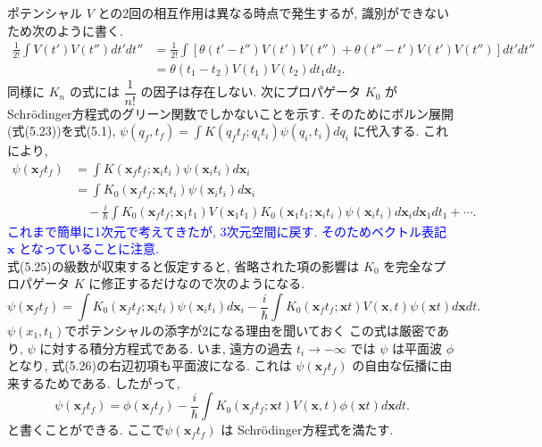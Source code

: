 \documentclass[a4paper,12pt]{article}
\begin{document}
ポテンシャル $V$ との2回の相互作用は異なる時点で発生するが, 識別ができないため次のように書く.
\begin{align*}
    \frac{1}{2!}\int V(t')V(t'') dt' dt'' &= \frac{1}{2!} \int \left[\theta(t' - t'')V(t')V(t'') + \theta(t'' - t')V(t')V(t'')\right]dt'dt''\\
    &= \theta(t_1 - t_2)V(t_1)V(t_2) dt_1 dt_2. \tag{5.24}
\end{align*}
同様に $K_n$ の式には $\dfrac{1}{n!}$ の因子は存在しない. 次にプロパゲータ $K_0$ がSchr\"{o}dinger方程式のグリーン関数でしかないことを示す. そのためにボルン展開(式(5.23))を式(5.1), $\displaystyle \psi(q_f, t_f) = \int K(q_{f}t_{f}; q_{i}t_{i})\psi(q_i, t_i)dq_i$ に代入する. これにより,
\begin{align*}
    \psi(\mathbf{x}_f t_f) &= \int K(\mathbf{x}_f t_f; \mathbf{x}_i t_i)\psi(\mathbf{x}_i t_i)d\mathbf{x}_i\\
    &= \int K_0(\mathbf{x}_f t_f; \mathbf{x}_i t_i)\psi(\mathbf{x}_i t_i)d\mathbf{x}_i\\
    &\quad - \frac{i}{\hbar}\int K_0(\mathbf{x}_f t_f; \mathbf{x}_1 t_1)V(\mathbf{x}_1 t_1)K_0(\mathbf{x}_1 t_1; \mathbf{x}_i t_i)\psi(\mathbf{x}_i t_i)d\mathbf{x}_i d\mathbf{x}_1 dt_1 + \cdots. \tag{5.25}
\end{align*}
\textcolor{blue}{これまで簡単に1次元で考えてきたが, 3次元空間に戻す. そのためベクトル表記 $\mathbf{x}$ となっていることに注意.}\\
式(5.25)の級数が収束すると仮定すると, 省略された項の影響は $K_0$ を完全なプロパゲータ $K$ に修正するだけなので次のようになる.
\begin{equation*}
    \psi(\mathbf{x}_f t_f) = \int K_0(\mathbf{x}_f t_f; \mathbf{x}_i t_i)\psi(\mathbf{x}_i t_i)d\mathbf{x}_i - \frac{i}{\hbar}\int K_0(\mathbf{x}_f t_f; \mathbf{x} t)V(\mathbf{x}, t)\psi(\mathbf{x}t)d\mathbf{x} dt. \tag{5.26}
\end{equation*}
\color{blue}
$\psi(x_1, t_1)$でポテンシャルの添字が2になる理由を聞いておく
\color{black}
この式は厳密であり, $\psi$ に対する積分方程式である. いま, 遠方の過去 $t_i \rightarrow -\infty$ では $\psi$ は平面波 $\phi$ となり, 式(5.26)の右辺初項も平面波になる. これは $\psi(\mathbf{x}_f t_f)$ の自由な伝播に由来するためである. したがって,
\begin{equation*}
    \psi(\mathbf{x}_f t_f) = \phi(\mathbf{x}_f t_f) - \frac{i}{\hbar}\int K_0(\mathbf{x}_f t_f; \mathbf{x} t)V(\mathbf{x}, t) \phi(\mathbf{x} t)d\mathbf{x} dt. \tag{5.27}
\end{equation*}
と書くことができる. ここで$\psi(\mathbf{x}_f t_f)$ は Schr\"{o}dinger方程式を満たす.
\end{document}
